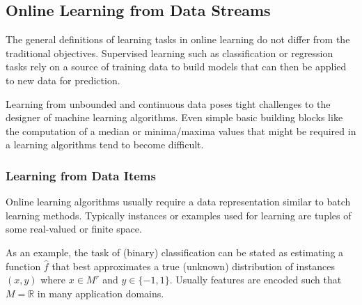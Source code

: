 


\subsection{\label{sec:onlineLearning}Online Learning from Data Streams}
The general definitions of learning tasks in online learning do not
differ from the traditional objectives. Supervised learning such as
classification or regression tasks rely on a source of training data
to build models that can then be applied to new data for prediction.

Learning from unbounded and continuous data poses tight challenges to
the designer of machine learning algorithms. Even simple basic
building blocks like the computation of a median or minima/maxima
values that might be required in a learning algorithms tend to become
difficult.

\subsubsection{\label{sec:dataExamples}Learning from Data Items}
Online learning algorithms usually require a data representation
similar to batch learning methods. Typically instances or examples
used for learning are tuples of some real-valued or finite space.

As an example, the task of (binary) classification can be stated as
estimating a function $\hat{f}$ that best approximates a true
(unknown) distribution of instances $(x,y)$ where $x\in M^r$ and $y
\in \{ -1,1 \}$. Usually features are encoded such that $M=\mathbb{R}$
in many application domains.

